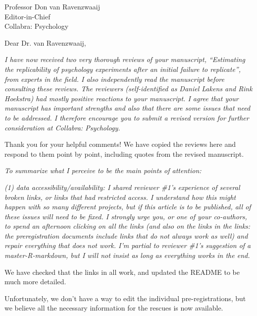 \documentclass{stanfordletter}
\newcommand{\theysaid}[1]{\begin{leftbar} \noindent 
		\textsl{ #1}\end{leftbar}}
\begin{document}
\signature{\vspace{-35pt} Veronica Boyce, \\ on behalf of the author team}


\begin{letter}{Professor Don van Ravenzwaaij \\ Editor-in-Chief \\ Collabra: Psychology }
	
	
	\opening{Dear Dr. van Ravenzwaaij,} 
		
		
		
		\theysaid{I have now received two very thorough reviews of your manuscript, “Estimating the replicability of psychology experiments after an initial failure to replicate”, from experts in the field. I also independently read the manuscript before consulting these reviews. The reviewers (self-identified as Daniel Lakens and Rink Hoekstra) had mostly positive reactions to your manuscript. I agree that your manuscript has important strengths and also that there are some issues that need to be addressed. I therefore encourage you to submit a revised version for further consideration at Collabra: Psychology.}
		
		Thank you for your helpful comments! We have copied the reviews here and respond to them point by point, including quotes from the revised manuscript. 
		
		\theysaid{To summarize what I perceive to be the main points of attention:}
		
		\theysaid{(1) data accessibility/availability: I shared reviewer \#1’s experience of several broken links, or links that had restricted access. I understand how this might happen with so many different projects, but if this article is to be published, all of these issues will need to be fixed. I strongly urge you, or one of your co-authors, to spend an afternoon clicking on all the links (and also on the links in the links: the preregistration documents include links that do not always work as well) and repair everything that does not work. I’m partial to reviewer \#1’s suggestion of a master-R-markdown, but I will not insist as long as everything works in the end.}
		
		
		We have checked that the links in %
		all work, and updated the README to be much more detailed. 
		
		Unfortunately, we don't have a way to edit the individual pre-registrations, but we believe all the necessary information for the rescues is now available. 
		

\end{letter}
\end{document}
